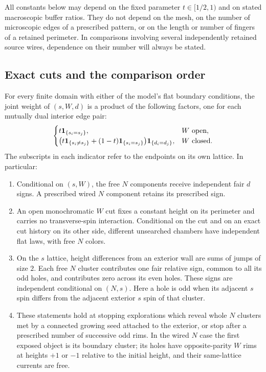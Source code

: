 All constants below may depend on the fixed parameter $t\in[1/2,1)$ and
on stated macroscopic buffer ratios. They do not depend on the mesh,
on the number of microscopic edges of a prescribed pattern, or on the
length or number of fingers of a retained perimeter. In comparisons
involving several independently retained source wires, dependence on
their number will always be stated.

\subsection{Exact cuts and the comparison order}

\begin{lemma}\label{lem:finite-cuts}
For every finite domain with either of the model's flat boundary
conditions, the joint weight of $(s,W,d)$ is a product
of the following factors, one for each mutually dual interior edge pair:
\begin{equation}\label{eq:spatial-edge-weight}
 \begin{cases}
 t\mathbf 1_{\{s_i=s_j\}},& W\text{ open},\\
 \bigl(t\mathbf 1_{\{s_i\ne s_j\}}+
       (1-t)\mathbf 1_{\{s_i=s_j\}}\bigr)
       \mathbf 1_{\{d_i=d_j\}},& W\text{ closed}.
 \end{cases}
\end{equation}
The subscripts in each indicator refer to the endpoints on its own
lattice. In particular:
\begin{enumerate}
\item Conditional on $(s,W)$, the free $N$ components receive independent
fair $d$ signs. A prescribed wired $N$ component retains its prescribed
sign.
\item An open monochromatic $W$ cut fixes a constant height on its
perimeter and carries no transverse-spin interaction. Conditional on
the cut and on an exact cut history on its other side, different
unsearched chambers have independent flat laws, with free $N$ colors.
\item On the $s$ lattice, height differences from an exterior wall are
sums of jumps of size $2$. Each free $N$ cluster contributes one fair
relative sign, common to all its odd holes, and contributes zero across
its even holes. These signs are independent conditional on $(N,s)$.
Here a hole is odd when its adjacent $s$ spin differs from the adjacent
exterior $s$ spin of that cluster.
\item These statements hold at stopping explorations which reveal whole
$N$ clusters met by a connected growing seed attached to the exterior,
or stop after a prescribed number of successive odd rims. In the wired
$N$ case the first exposed object is its boundary cluster; its holes
have opposite-parity $W$ rims at heights $+1$ or $-1$ relative to the
initial height, and their same-lattice currents are free.
\end{enumerate}
\end{lemma}

